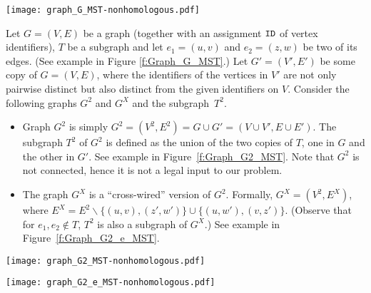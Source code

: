 \documentclass[11pt,letter]{article}
\def\ID{\mbox{\tt ID}}
\def\sminus{\smallsetminus}
\begin{document}
\begin{figure*}[htb]
\begin{center}
\begin{minipage}{\textwidth}
\centerline{\texttt{[image: graph\_G\_MST-nonhomologous.pdf]}}
\end{minipage}
\caption[]{
\label{f:Graph_G_MST}
\sf Graph $G$ with ST candidate $T$ (the bold edges belong to $T$)}
\end{center}
\end{figure*}

Let $G=(V, E)$ be a graph (together with an assignment $\ID$
of vertex identifiers), 
$T$ be a subgraph and let $e_1=(u,v)$ and $e_2=(z,w)$ be two of its edges.
(See example in Figure \ref{f:Graph_G_MST}.) 
Let  $G'=(V',E')$ be some copy of $G=(V,E)$, where the identifiers of 
the vertices in $V'$ are not only pairwise distinct but also distinct 
from the given identifiers on $V$. Consider the following graphs 
$G^2$ and $G^X$ and the subgraph~$T^2$. 
\begin{itemize}
\item
 Graph $G^2$ is simply $G^2=(V^2, E^2)=G\cup G'=(V\cup V', E\cup E')$.
The subgraph $T^2$ of $G^2$ is defined as the union of the two copies of $T$, 
one in $G$ and the other in $G'$. See example in Figure~\ref{f:Graph_G2_MST}.
Note that $G^2$ is not connected, hence it is not a legal input to our problem.
\item
The graph $G^X$ is a ``cross-wired'' version of $G^2$. 
Formally,
$G^X=(V^2, E^X)$, where 
$E^X=E^{2}\sminus \{(u,v),(z',w')\} \cup \{(u,w'), (v,z')\}$. 
(Observe that for $e_1,e_2\notin T$, $T^2$ is also a subgraph of $G^X$.) 
See example in Figure~\ref{f:Graph_G2_e_MST}.
\end{itemize}

\begin{figure*}[htb]
\begin{center}
\begin{minipage}{\textwidth}
\centerline{\texttt{[image: graph\_G2\_MST-nonhomologous.pdf]}}
\end{minipage}
\caption[]{
\label{f:Graph_G2_MST}
\sf Graph $G^2$ with ST candidate $T^2$ (the bold edges belong to $T^2$)}
\end{center}
\end{figure*}

\begin{figure*}[htb]
\begin{center}
\begin{minipage}{\textwidth}
\centerline{\texttt{[image: graph\_G2\_e\_MST-nonhomologous.pdf]}}
\end{minipage}
\caption[]{
\label{f:Graph_G2_e_MST}
\sf Graph $G^X$ with ST candidate $T^2$ (the bold edges belong to $T^2$)}
\end{center}
\end{figure*}
\end{document}
